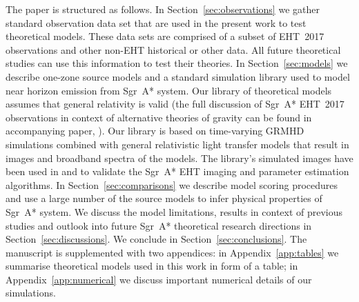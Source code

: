The paper is structured as follows. In Section~\ref{sec:observations} we gather standard observation data set that are used in the present work to test theoretical models. These data sets are comprised of a subset of EHT~2017 observations and other non-EHT historical or other data. All future theoretical studies can use this information to test their theories. In Section~\ref{sec:models} we describe one-zone source models and a standard simulation library used to model near horizon emission from Sgr~A* system. Our library of theoretical models assumes that general relativity is valid (the full discussion of Sgr~A* EHT~2017 observations in context of alternative theories of gravity can be found in accompanying paper, ).
Our library is based on time-varying GRMHD simulations combined with general relativistic light transfer models that result in images and broadband spectra of the models. The library's simulated images have been used in  and  to validate the Sgr~A* EHT imaging and parameter estimation algorithms. 
In Section~\ref{sec:comparisons} we describe model scoring procedures and use a large number of the source models to infer physical properties of Sgr~A* system. We discuss the model limitations, results in context of previous studies and outlook into future Sgr~A* theoretical research directions in Section~\ref{sec:discussions}. We conclude in Section~\ref{sec:conclusions}. 
The manuscript is supplemented with two appendices: in Appendix~\ref{app:tables} we summarise theoretical models used in this work in form of a table; in Appendix~\ref{app:numerical} we discuss important numerical details of our simulations.



